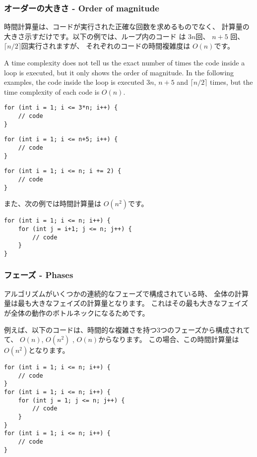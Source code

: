 \subsubsection*{オーダーの大きさ - Order of magnitude}

時間計算量は、コードが実行された正確な回数を求めるものでなく、
計算量の大きさ示すだけです。以下の例では、ループ内のコード は $3n$回、
$n+5$ 回、$\lceil n/2 \rceil$回実行されますが、
それぞれのコードの時間複雑度は $O(n)$です。

A time complexity does not tell us the exact number
of times the code inside a loop is executed,
but it only shows the order of magnitude.
In the following examples, the code inside the loop
is executed $3n$, $n+5$ and $\lceil n/2 \rceil$ times,
but the time complexity of each code is $O(n)$.

\begin{lstlisting}
for (int i = 1; i <= 3*n; i++) {
    // code
}
\end{lstlisting}

\begin{lstlisting}
for (int i = 1; i <= n+5; i++) {
    // code
}
\end{lstlisting}

\begin{lstlisting}
for (int i = 1; i <= n; i += 2) {
    // code
}
\end{lstlisting}

また、次の例では時間計算量は $O(n^2)$です。

\begin{lstlisting}
for (int i = 1; i <= n; i++) {
    for (int j = i+1; j <= n; j++) {
        // code
    }
}
\end{lstlisting}

\subsubsection*{フェーズ - Phases}

アルゴリズムがいくつかの連続的なフェーズで構成されている時、
全体の計算量は最も大きなフェイズの計算量となります。
これはその最も大きなフェイズが全体の動作のボトルネックになるためです。

例えば、以下のコードは、時間的な複雑さを持つ3つのフェーズから構成されてて、
$O(n)$, $O(n^2)$ , $O(n)$からなります。
この場合、この時間計算量は$O(n^2)$となります。

\begin{lstlisting}
for (int i = 1; i <= n; i++) {
    // code
}
for (int i = 1; i <= n; i++) {
    for (int j = 1; j <= n; j++) {
        // code
    }
}
for (int i = 1; i <= n; i++) {
    // code
}
\end{lstlisting}

